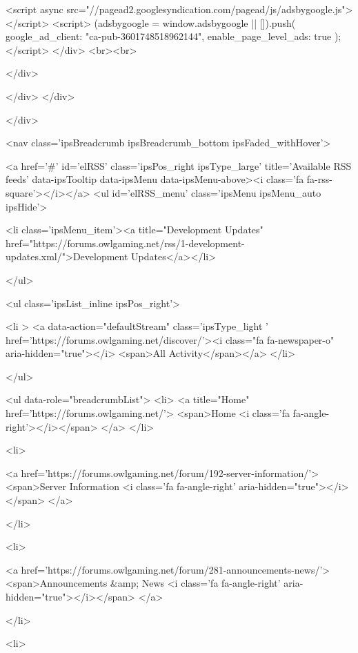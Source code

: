 <script async src="//pagead2.googlesyndication.com/pagead/js/adsbygoogle.js"></script>
<script>
     (adsbygoogle = window.adsbygoogle || []).push({
          google_ad_client: "ca-pub-3601748518962144",
          enable_page_level_ads: true
     });
</script>
			</div>
			<br><br>
		
		


	</div>

						</div>
					</div>
					
				</div>
				

				
<nav class='ipsBreadcrumb ipsBreadcrumb_bottom ipsFaded_withHover'>
	
		


	<a href='#' id='elRSS' class='ipsPos_right ipsType_large' title='Available RSS feeds' data-ipsTooltip data-ipsMenu data-ipsMenu-above><i class='fa fa-rss-square'></i></a>
	<ul id='elRSS_menu' class='ipsMenu ipsMenu_auto ipsHide'>
		
			<li class='ipsMenu_item'><a title="Development Updates" href="https://forums.owlgaming.net/rss/1-development-updates.xml/">Development Updates</a></li>
		
	</ul>

	

	<ul class='ipsList_inline ipsPos_right'>
		
		<li >
			<a data-action="defaultStream" class='ipsType_light '  href='https://forums.owlgaming.net/discover/'><i class="fa fa-newspaper-o" aria-hidden="true"></i> <span>All Activity</span></a>
		</li>
		
	</ul>

	<ul data-role="breadcrumbList">
		<li>
			<a title="Home" href='https://forums.owlgaming.net/'>
				<span>Home <i class='fa fa-angle-right'></i></span>
			</a>
		</li>
		
		
			<li>
				
					<a href='https://forums.owlgaming.net/forum/192-server-information/'>
						<span>Server Information <i class='fa fa-angle-right' aria-hidden="true"></i></span>
					</a>
				
			</li>
		
			<li>
				
					<a href='https://forums.owlgaming.net/forum/281-announcements-news/'>
						<span>Announcements &amp; News <i class='fa fa-angle-right' aria-hidden="true"></i></span>
					</a>
				
			</li>
		
			<li>
				
